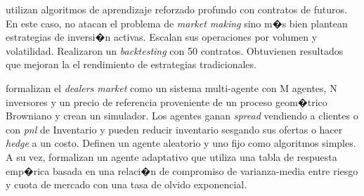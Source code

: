 \documentclass[12pt,a4paper,spanish]{article}%
\begin{document}
\cite{Zhang2019} utilizan algoritmos de aprendizaje reforzado profundo con contratos de futuros. En este caso, no atacan el problema de \textit{market making} sino m�s bien plantean estrategias de inversi�n activas. Escalan sus operaciones por volumen y volatilidad. Realizaron un \textit{backtesting} con 50 contratos. Obtuvienen resultados que mejoran la el rendimiento de estrategias tradicionales.

\cite{Ganesh2019} formalizan el \textit{dealers market} como un sistema multi-agente con M agentes, N inversores y un precio de referencia proveniente de un proceso geom�trico Browniano y crean un simulador. Los agentes ganan \textit{spread} vendiendo a clientes o con \textit{pnl} de Inventario y pueden reducir inventario sesgando sus ofertas o hacer \textit{hedge} a un costo. Definen un agente aleatorio y uno fijo como algoritmos simples. A su vez, formalizan un agente adaptativo que utiliza una tabla de respuesta emp�rica basada en una relaci�n de compromiso de varianza-media entre riesgo y cuota de mercado con una tasa de olvido exponencial.

\end{document}
